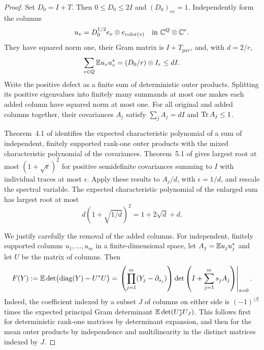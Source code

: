 \begin{proof}
Set $D_0=I+T$. Then $0\leq D_0\leq2I$ and $(D_0)_{vv}=1$.
Independently form the columns
\[
 u_v=D_0^{1/2}e_v\otimes e_{\mathrm{color}(v)}
       \quad\text{in }\mathbb C^Q\otimes\mathbb C^r.
\]
They have squared norm one, their Gram matrix is $I+T_{\mathrm{pav}}$,
and, with $d=2/r$,
\[
 \sum_{v\in Q}\mathbb E u_vu_v^*=(D_0/r)\otimes I_r\leq dI.
\]
Write the positive defect as a finite sum of deterministic outer products.
Splitting its positive eigenvalues into finitely many summands
at most one makes each added column have squared norm at most one.
For all original and added columns together, their covariances $A_j$
satisfy $\sum_j A_j=dI$ and $\operatorname{Tr} A_j\leq1$.

Theorem~4.1 of \cite{MSS15} identifies the expected characteristic
polynomial of a sum of independent, finitely supported rank-one outer
products with the mixed characteristic polynomial of the covariances.
Theorem~5.1 of \cite{MSS15} gives largest root at most
$(1+\sqrt{\epsilon})^2$ for positive semidefinite covariances summing
to $I$ with individual traces at most $\epsilon$. Apply these results
to $A_j/d$, with $\epsilon=1/d$, and rescale the spectral variable.
The expected characteristic polynomial of the enlarged sum has largest
root at most
\begin{equation}\label{poly:enlarged-root}
 d(1+\sqrt{1/d})^2=1+2\sqrt d+d.
\end{equation}

We justify carefully the removal of the added columns. For independent,
finitely supported columns $u_1,\ldots,u_m$ in a finite-dimensional space, let
$A_j=\mathbb E u_ju_j^*$ and let $U$ be the matrix of columns. Then
\begin{equation}\label{poly:gram-stability}
 F(Y):=\mathbb E\det\bigl(\operatorname{diag}(Y)-U^*U\bigr)
 =\left.
   \left(\prod_{j=1}^m(Y_j-\partial_{s_j})\right)
   \det\left(I+\sum_{j=1}^m s_j A_j\right)
   \right|_{s=0}.
\end{equation}
Indeed, the coefficient indexed by a subset $J$ of columns on either
side is $(-1)^{|J|}$ times the expected principal Gram determinant
$\mathbb E\det(U_J^*U_J)$. This follows first for deterministic rank-one
matrices by determinant expansion, and then for the mean outer products
by independence and multilinearity in the distinct matrices indexed
by $J$.


\end{proof}
